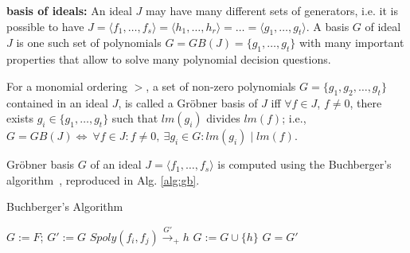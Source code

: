 {\bf \Grobner basis of ideals:} An ideal $J$ may have many different sets
of generators, i.e. it is possible to have  $J = \langle f_1, \dots,
f_s\rangle = \langle h_1,\dots, h_r\rangle = \dots = \langle g_1,
\dots, g_t \rangle$. A \Grobner basis $G$ of ideal $J$ is one such set
of polynomials $G = GB(J) = \{g_1, \dots, g_t\}$ with many important
properties that allow to solve many polynomial decision questions. 

\begin{Definition}
\label{def:gb}
For a monomial ordering $>$, a set  of non-zero polynomials $G =
\{g_1,g_2,\dots,g_t\}$ contained in an ideal $J$, is called a
Gr\"{o}bner basis of $J$ iff 
$\forall f \in J$, $f\neq 0$, there exists $g_i \in 
\{g_1,\dots, g_t\}$ such
that $lm(g_i)$ divides $lm(f)$; i.e., 
$G = GB(J) \Leftrightarrow\  \forall f \in J : f \neq 0, \ \exists g_i \in G :
lm(g_i)\mid lm(f)$. 

\end{Definition}


\par Gr\"obner basis $G$ of an ideal $J = \langle
f_1,\dots,f_s\rangle$ is computed using the Buchberger's
algorithm~\cite{buchberger_thesis}, 
reproduced in Alg. \ref{alg:gb}.

\begin{algorithm}
\caption {Buchberger's Algorithm}
\label{alg:gb}
\begin{algorithmic}[1]
  \State $G:= F$;
  \Repeat
    \State $G' := G$
      \State $Spoly(f_i, f_j) \stackrel{G'}{\textstyle\longrightarrow}_+h$ 
       \State $G:= G \cup \{h\}$ \EndIf
    \EndFor
  \Until $G = G'$
\end{algorithmic}
\end{algorithm}


